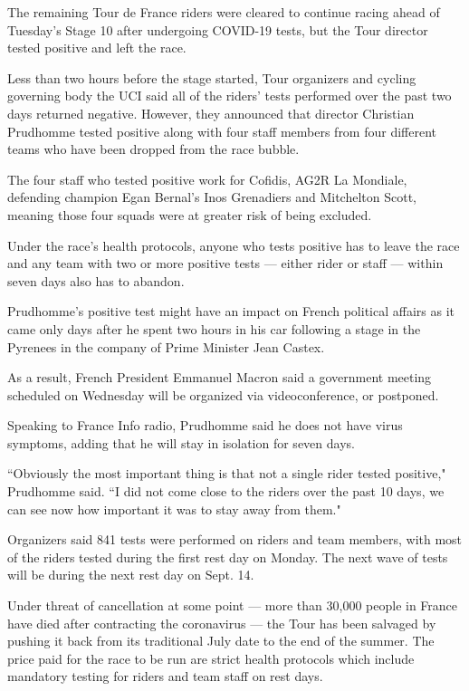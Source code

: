The remaining Tour de France riders were cleared to continue racing
ahead of Tuesday's Stage 10 after undergoing COVID-19 tests, but the
Tour director tested positive and left the race.

Less than two hours before the stage started, Tour organizers and
cycling governing body the UCI said all of the riders' tests performed
over the past two days returned negative. However, they announced that
director Christian Prudhomme tested positive along with four staff
members from four different teams who have been dropped from the race
bubble.

The four staff who tested positive work for Cofidis, AG2R La Mondiale,
defending champion Egan Bernal's Inos Grenadiers and Mitchelton Scott,
meaning those four squads were at greater risk of being excluded.

Under the race's health protocols, anyone who tests positive has to
leave the race and any team with two or more positive tests --- either
rider or staff --- within seven days also has to abandon.

Prudhomme's positive test might have an impact on French political
affairs as it came only days after he spent two hours in his car
following a stage in the Pyrenees in the company of Prime Minister Jean
Castex.

As a result, French President Emmanuel Macron said a government meeting
scheduled on Wednesday will be organized via videoconference, or
postponed.

Speaking to France Info radio, Prudhomme said he does not have virus
symptoms, adding that he will stay in isolation for seven days.

``Obviously the most important thing is that not a single rider tested
positive," Prudhomme said. ``I did not come close to the riders over the
past 10 days, we can see now how important it was to stay away from
them."

Organizers said 841 tests were performed on riders and team members,
with most of the riders tested during the first rest day on Monday. The
next wave of tests will be during the next rest day on Sept. 14.

Under threat of cancellation at some point --- more than 30,000 people
in France have died after contracting the coronavirus --- the Tour has
been salvaged by pushing it back from its traditional July date to the
end of the summer. The price paid for the race to be run are strict
health protocols which include mandatory testing for riders and team
staff on rest days.

